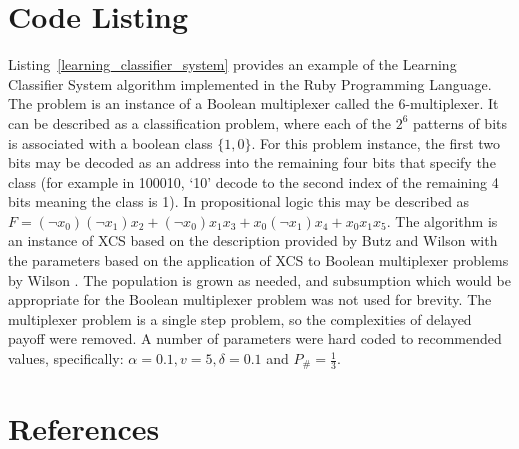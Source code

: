 \documentclass[a4paper, 11pt]{article}
\begin{document}
\section{Code Listing}
\label{sec:code}
Listing~\ref{learning_classifier_system} provides an example of the Learning Classifier System algorithm implemented in the Ruby Programming Language. 
The problem is an instance of a Boolean multiplexer called the 6-multiplexer. It can be described as a classification problem, where each of the $2^6$ patterns of bits is associated with a boolean class $\{1,0\}$. For this problem instance, the first two bits may be decoded as an address into the remaining four bits that specify the class (for example in 100010, `10' decode to the second index of the remaining 4 bits meaning the class is 1). In propositional logic this may be described as $F=(\neg x_0) (\neg x_1) x_2 + (\neg x_0) x_1 x_3 + x_0 (\neg x_1) x_4 + x_0 x_1 x_5$. 
The algorithm is an instance of XCS based on the description provided by Butz and Wilson \cite{Butz2002a} with the parameters based on the application of XCS to Boolean multiplexer problems by Wilson \cite{Wilson1995, Wilson1998}.
The population is grown as needed, and subsumption which would be appropriate for the Boolean multiplexer problem was not used for brevity. The multiplexer problem is a single step problem, so the complexities of delayed payoff were removed. A number of parameters were hard coded to recommended values, specifically: $\alpha=0.1, v=5, \delta=0.1$ and $P_{\#}=\frac{1}{3}$.




\section{References}
\label{sec:references}
\end{document}
